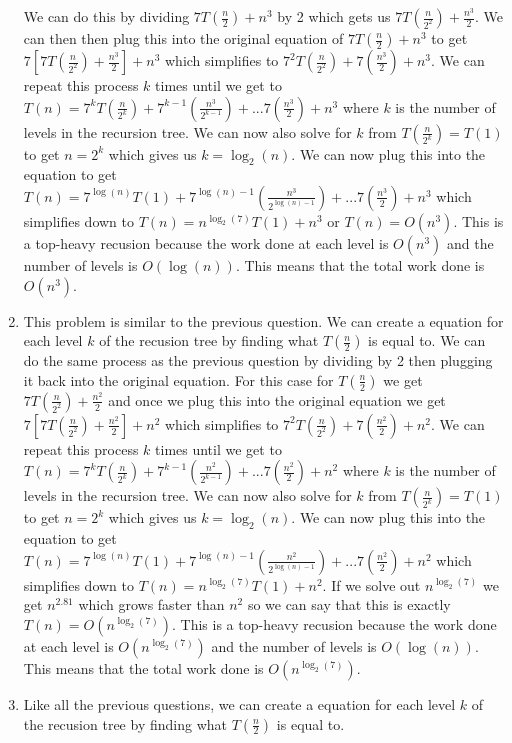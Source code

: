 \documentclass[12pt,letterpaper]{article}
\begin{document}
\begin{enumerate}
    We can do this by dividing $7T(\frac{n}{2})+n^3$ by 2 which gets us $7T(\frac{n}{2^2})+\frac{n^3}{2}$. We can then
    then plug this into the original equation of $7T(\frac{n}{2})+n^3$ to get $7[7T(\frac{n}{2^2}) + \frac{n^3}{2}] + n^3$ which
    simplifies to $7^2T(\frac{n}{2^2}) + 7(\frac{n^3}{2}) + n^3$. We can repeat this process $k$ times until we get to $T(n) = 7^kT(\frac{n}{2^k}) + 7^{k-1}(\frac{n^3}{2^{k-1}})+ ... 7(\frac{n^3}{2}) + n^3$
    where $k$ is the number of levels in the recursion tree. We can now also solve for $k$ from $T(\frac{n}{2^k}) = T(1)$ to get 
    $n = 2^k$ which gives us $k = \log_2(n)$. We can now plug this into the equation to get $T(n) = 7^{\log(n)}T(1) + 7^{\log(n)-1}(\frac{n^3}{2^{\log(n)-1}})+ ... 7(\frac{n^3}{2}) + n^3$ which
    simplifies down to $T(n) = n^{\log_2(7)}T(1) + n^3$ or $T(n) = O(n^3)$. This is a top-heavy recusion because the work done at each
    level is $O(n^3)$ and the number of levels is $O(\log(n))$. This means that the total work done is $O(n^3)$.
    \item This problem is similar to the previous question. We can create a equation for each level $k$ of the recusion tree by finding what $T(\frac{n}{2})$ is equal to.
    We can do the same process as the previous question by dividing by 2 then plugging it back into the original equation. For this case for $T(\frac{n}{2})$
    we get $7T(\frac{n}{2^2}) + \frac{n^2}{2}$ and once we plug this into the original equation we get $7[7T(\frac{n}{2^2}) + \frac{n^2}{2}] + n^2$ which
    simplifies to $7^2T(\frac{n}{2^2}) + 7(\frac{n^2}{2}) + n^2$. We can repeat this process $k$ times until we get to $T(n) = 7^kT(\frac{n}{2^k}) + 7^{k-1}(\frac{n^2}{2^{k-1}})+ ... 7(\frac{n^2}{2}) + n^2$
    where $k$ is the number of levels in the recursion tree. We can now also solve for $k$ from $T(\frac{n}{2^k}) = T(1)$ to get 
    $n = 2^k$ which gives us $k = \log_2(n)$. We can now plug this into the equation to get $T(n) = 7^{\log(n)}T(1) + 7^{\log(n)-1}(\frac{n^2}{2^{\log(n)-1}})+ ... 7(\frac{n^2}{2}) + n^2$ which
    simplifies down to $T(n) = n^{\log_2(7)}T(1) + n^2$. If we solve out $n^{\log_2(7)}$ we get $n^{2.81}$ which grows faster than $n^2$ so we can say that this is exactly
    $T(n) = O(n^{\log_2(7)})$. This is a top-heavy recusion because the work done at each 
    level is $O(n^{\log_2(7)})$ and the number of levels is $O(\log(n))$. This means that the total work done is $O(n^{\log_2(7)})$.
    \item Like all the previous questions, we can create a equation for each level $k$ of the recusion tree by finding what $T(\frac{n}{2})$ is equal to.

\end{enumerate}
\end{document}
